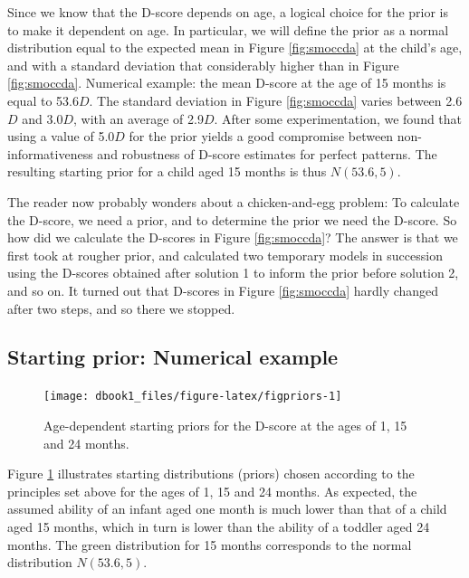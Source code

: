\documentclass[
]{book}
\begin{document}
Since we know that the D-score depends on age, a logical choice for the prior is to make it dependent on age. In particular, we will define the prior as a normal distribution equal to the expected mean in Figure \ref{fig:smoccda} at the child's age, and with a standard deviation that considerably higher than in Figure \ref{fig:smoccda}. Numerical example: the mean D-score at the age of 15 months is equal to 53.6\(D\). The standard deviation in Figure \ref{fig:smoccda} varies between 2.6\(D\) and 3.0\(D\), with an average of 2.9\(D\). After some experimentation, we found that using a value of 5.0\(D\) for the prior yields a good compromise between non-informativeness and robustness of D-score estimates for perfect patterns. The resulting starting prior for a child aged 15 months is thus \(N(53.6, 5)\).

The reader now probably wonders about a chicken-and-egg problem: To calculate the D-score, we need a prior, and to determine the prior we need the D-score. So how did we calculate the D-scores in Figure \ref{fig:smoccda}? The answer is that we first took at rougher prior, and calculated two temporary models in succession using the D-scores obtained after solution 1 to inform the prior before solution 2, and so on. It turned out that D-scores in Figure \ref{fig:smoccda} hardly changed after two steps, and so there we stopped.

\hypertarget{sec:adp}{%
\subsection{Starting prior: Numerical example}\label{sec:adp}}

\begin{figure}

{\centering \texttt{[image: dbook1\_files/figure-latex/figpriors-1]} 

}

\caption{Age-dependent starting priors for the D-score at the ages of 1, 15 and 24 months.}\label{fig:figpriors}
\end{figure}



Figure \ref{fig:figpriors} illustrates starting distributions (priors) chosen according to the principles set above for the ages of 1, 15 and 24 months. As expected, the assumed ability of an infant aged one month is much lower than that of a child aged 15 months, which in turn is lower than the ability of a toddler aged 24 months. The green distribution for 15 months corresponds to the normal distribution \(N(53.6, 5)\).
\end{document}
